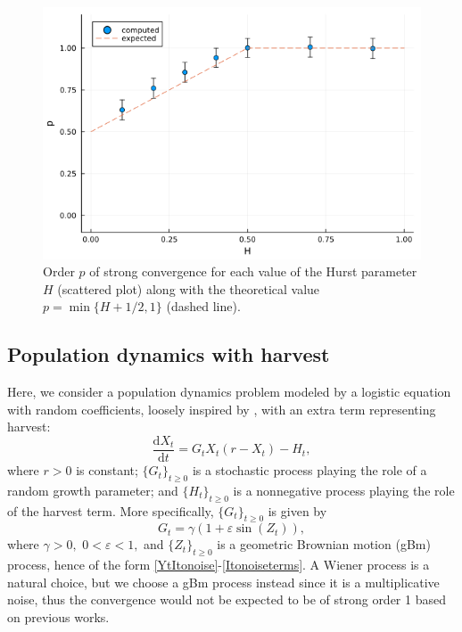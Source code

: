 \documentclass[reqno,12pt]{amsart}
\theoremstyle{plain} %
\theoremstyle{definition} %
\begin{document}
\begin{figure}[htb]
    \includegraphics[scale=0.4]{img/order_dep_on_H_fBm.png}
    \caption{Order $p$ of strong convergence for each value of the Hurst parameter $H$ (scattered plot) along with the theoretical value $p=\min\{H + 1/2, 1\}$ (dashed line).}
    \label{figorderdepHfBm}
\end{figure}

\subsection{Population dynamics with harvest}
\label{secpopdyn}

Here, we consider a population dynamics problem modeled by a logistic equation with random coefficients, loosely inspired by \cite[Section 15.2]{HanKloeden2017}, with an extra term representing harvest:
\begin{equation}
    \label{rodepopulationdynamics}
    \frac{\mathrm{d}X_t}{\mathrm{d}t} = G_t X_t (r - X_t) - H_t,
\end{equation}
where $r > 0$ is constant; $\{G_t\}_{t \geq 0}$ is a stochastic process playing the role of a random growth parameter; and $\{H_t\}_{t\geq 0}$ is a nonnegative process playing the role of the harvest term. More specifically, $\{G_t\}_{t \geq 0}$ is given by
\[
    G_t = \gamma (1 + \varepsilon \sin(Z_t)),
\]
where $\gamma > 0,$ $0 < \varepsilon < 1,$ and $\{Z_t\}_{t\geq 0}$ is a geometric Brownian motion (gBm) process, hence of the form \eqref{YtItonoise}-\eqref{Itonoiseterms}. A Wiener process is a natural choice, but we choose a gBm process instead since it is a multiplicative noise, thus the convergence would not be expected to be of strong order 1 based on previous works.
\end{document}

